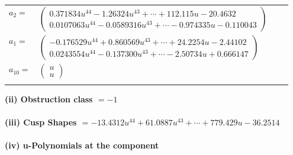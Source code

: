 \documentclass[1p]{elsarticle_modified}
\theoremstyle{definition}
\begin{document}
\begin{tabular}{m{7pt} m{180pt} m{7pt} m{180pt} }
\flushright $a_{2}=$&$\begin{pmatrix}0.371834 u^{44}-1.26324 u^{43}+\cdots+112.115 u-20.4632\\0.0107063 u^{44}-0.0589316 u^{43}+\cdots-0.974335 u-0.110043\end{pmatrix}$ \\
\flushright $a_{1}=$&$\begin{pmatrix}-0.176529 u^{44}+0.860569 u^{43}+\cdots+24.2254 u-2.44102\\0.0243554 u^{44}-0.137300 u^{43}+\cdots-2.50734 u+0.666147\end{pmatrix}$ \\
\flushright $a_{10}=$&$\begin{pmatrix}u\\u\end{pmatrix}$\\&\end{tabular}
\flushleft \textbf{(ii) Obstruction class $= -1$}\\~\\
\flushleft \textbf{(iii) Cusp Shapes $= -13.4312 u^{44}+61.0887 u^{43}+\cdots+779.429 u-36.2514$}\\~\\
\newpage\renewcommand{\arraystretch}{1}
\flushleft \textbf{(iv) u-Polynomials at the component}\newline \\
\end{document}
